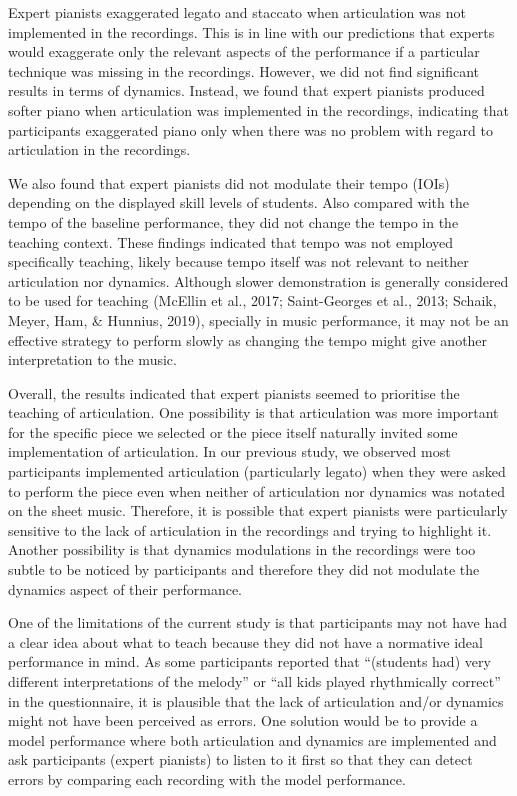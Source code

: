\documentclass[
  man,floatsintext]{apa6}
\begin{document}
Expert pianists exaggerated legato and staccato when articulation was not implemented in the recordings. This is in line with our predictions that experts would exaggerate only the relevant aspects of the performance if a particular technique was missing in the recordings. However, we did not find significant results in terms of dynamics. Instead, we found that expert pianists produced softer piano when articulation was implemented in the recordings, indicating that participants exaggerated piano only when there was no problem with regard to articulation in the recordings.

We also found that expert pianists did not modulate their tempo (IOIs) depending on the displayed skill levels of students. Also compared with the tempo of the baseline performance, they did not change the tempo in the teaching context. These findings indicated that tempo was not employed specifically teaching, likely because tempo itself was not relevant to neither articulation nor dynamics. Although slower demonstration is generally considered to be used for teaching (McEllin et al., 2017; Saint-Georges et al., 2013; Schaik, Meyer, Ham, \& Hunnius, 2019), specially in music performance, it may not be an effective strategy to perform slowly as changing the tempo might give another interpretation to the music.

Overall, the results indicated that expert pianists seemed to prioritise the teaching of articulation. One possibility is that articulation was more important for the specific piece we selected or the piece itself naturally invited some implementation of articulation. In our previous study, we observed most participants implemented articulation (particularly legato) when they were asked to perform the piece even when neither of articulation nor dynamics was notated on the sheet music. Therefore, it is possible that expert pianists were particularly sensitive to the lack of articulation in the recordings and trying to highlight it. Another possibility is that dynamics modulations in the recordings were too subtle to be noticed by participants and therefore they did not modulate the dynamics aspect of their performance.

One of the limitations of the current study is that participants may not have had a clear idea about what to teach because they did not have a normative ideal performance in mind. As some participants reported that ``(students had) very different interpretations of the melody'' or ``all kids played rhythmically correct'' in the questionnaire, it is plausible that the lack of articulation and/or dynamics might not have been perceived as errors. One solution would be to provide a model performance where both articulation and dynamics are implemented and ask participants (expert pianists) to listen to it first so that they can detect errors by comparing each recording with the model performance.
\end{document}
